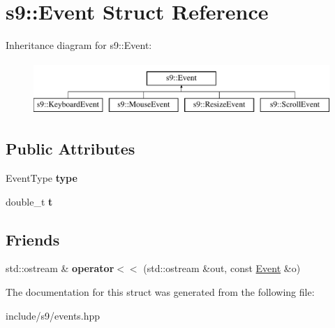 \hypertarget{structs9_1_1Event}{\section{s9\-:\-:Event Struct Reference}
\label{structs9_1_1Event}
}
Inheritance diagram for s9\-:\-:Event\-:\begin{figure}[H]
\begin{center}
\leavevmode
\includegraphics[height=2.000000cm]{structs9_1_1Event}
\end{center}
\end{figure}
\subsection*{Public Attributes}
\begin{DoxyCompactItemize}
\item 
\hypertarget{structs9_1_1Event_ac6d2a02aeab6cd0c5ffd05d67fcb71f0}{Event\-Type {\bfseries type}}\label{structs9_1_1Event_ac6d2a02aeab6cd0c5ffd05d67fcb71f0}

\item 
\hypertarget{structs9_1_1Event_a600210822b48f7a2f88c9acb3f0d2088}{double\-\_\-t {\bfseries t}}\label{structs9_1_1Event_a600210822b48f7a2f88c9acb3f0d2088}

\end{DoxyCompactItemize}
\subsection*{Friends}
\begin{DoxyCompactItemize}
\item 
\hypertarget{structs9_1_1Event_a7789ff8e8663c0ff98d2758bbf41116e}{std\-::ostream \& {\bfseries operator$<$$<$} (std\-::ostream \&out, const \hyperlink{structs9_1_1Event}{Event} \&o)}\label{structs9_1_1Event_a7789ff8e8663c0ff98d2758bbf41116e}

\end{DoxyCompactItemize}


The documentation for this struct was generated from the following file\-:\begin{DoxyCompactItemize}
\item 
include/s9/events.\-hpp\end{DoxyCompactItemize}
